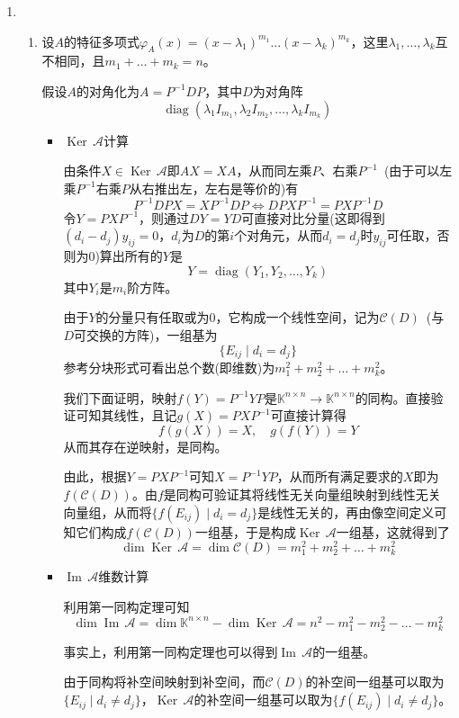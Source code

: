 \documentclass[a4paper,UTF8,fontset=windows,AutoFakeBold]{ctexart}
\DeclareMathOperator{\diag}{diag}
\DeclareMathOperator{\im}{Im\,}
\DeclareMathOperator{\Ker}{Ker\,}
\newcommand*{\ma}{\mathcal{A}}
\newcommand*{\mc}{\mathcal{C}}
\begin{document}
\begin{enumerate}
    \item
    \begin{enumerate}
        \item 设$A$的特征多项式$\varphi_A(x)=(x-\lambda_1)^{m_1}\dots(x-\lambda_k)^{m_k}$，这里$\lambda_1,\dots,\lambda_k$互不相同，且$m_1+\dots+m_k=n$。
        
        假设$A$的对角化为$A=P^{-1}DP$，其中$D$为对角阵
        $$\diag(\lambda_1I_{m_1},\lambda_2I_{m_2},\dots,\lambda_kI_{m_k})$$

        \begin{itemize}
            \item $\Ker\ma$计算
            
            由条件$X\in\Ker\ma$即$AX=XA$，从而同左乘$P$、右乘$P^{-1}$\ (由于可以左乘$P^{-1}$右乘$P$从右推出左，左右是等价的)有
            $$P^{-1}DPX=XP^{-1}DP\Longleftrightarrow DPXP^{-1}=PXP^{-1}D$$
            令$Y=PXP^{-1}$，则通过$DY=YD$可直接对比分量(这即得到$(d_i-d_j)y_{ij}=0$，$d_i$为$D$的第$i$个对角元，从而$d_i=d_j$时$y_{ij}$可任取，否则为0)算出所有的$Y$是
            $$Y=\diag(Y_1,Y_2,\dots,Y_k)$$
            其中$Y_i$是$m_i$阶方阵。

            由于$Y$的分量只有任取或为0，它构成一个线性空间，记为$\mc(D)$\ (与$D$可交换的方阵)，一组基为
            $$\{E_{ij}\mid d_i=d_j\}$$
            参考分块形式可看出总个数(即维数)为$m_1^2+m_2^2+\dots+m_k^2$。

            我们下面证明，映射$f(Y)=P^{-1}YP$是$\mathbb{K}^{n\times n}\to\mathbb{K}^{n\times n}$的同构。直接验证可知其线性，且记$g(X)=PXP^{-1}$可直接计算得
            $$f(g(X))=X,\quad g(f(Y))=Y$$
            从而其存在逆映射，是同构。

            由此，根据$Y=PXP^{-1}$可知$X=P^{-1}YP$，从而所有满足要求的$X$即为$f(\mc(D))$。由$f$是同构可验证其将线性无关向量组映射到线性无关向量组，从而将$\{f(E_{ij})\mid d_i=d_j\}$是线性无关的，再由像空间定义可知它们构成$f(\mc(D))$一组基，于是构成$\Ker\ma$一组基，这就得到了
            $$\dim\Ker\ma=\dim\mc(D)=m_1^2+m_2^2+\dots+m_k^2$$

            \item $\im\ma$维数计算

            利用第一同构定理可知
            $$\dim\im\ma=\dim\mathbb{K}^{n\times n}-\dim\Ker\ma=n^2-m_1^2-m_2^2-\dots-m_k^2$$

            事实上，利用第一同构定理也可以得到$\im\ma$的一组基。
            
            由于同构将补空间映射到补空间，而$\mc(D)$的补空间一组基可以取为$\{E_{ij}\mid d_i\ne d_j\}$，$\Ker\ma$的补空间一组基可以取为$\{f(E_{ij})\mid d_i\ne d_j\}$。
            

\end{itemize}
\end{enumerate}
\end{enumerate}
\end{document}
